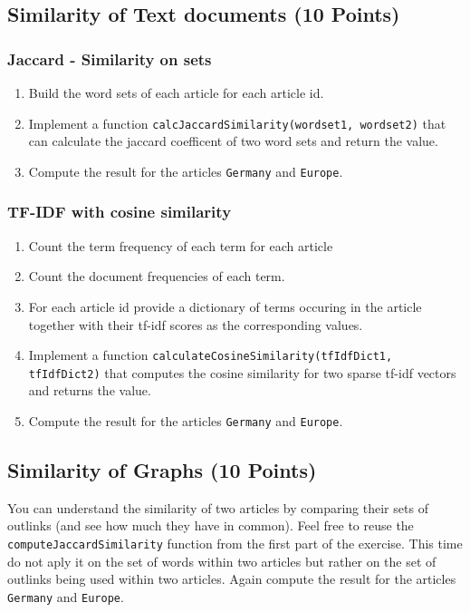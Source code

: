 \documentclass{WeSTassignment}
\begin{document}
\subsection{Similarity of Text documents  (10 Points)}
\subsubsection{Jaccard - Similarity on sets}
\begin{enumerate}
\item Build the word sets of each article for each article id.
\item Implement a function \texttt{calcJaccardSimilarity(wordset1, wordset2)} that can calculate the jaccard coefficent of two word sets and return the value.
\item Compute the result for the articles \texttt{Germany} and \texttt{Europe}.
\end{enumerate}

\subsubsection{TF-IDF with cosine similarity}
\begin{enumerate}
\item Count the term frequency of each term for each article
\item Count the document frequencies of each term. 
\item For each article id provide a dictionary of terms occuring in the article together with their tf-idf scores as the corresponding values.
\item Implement a function \texttt{calculateCosineSimilarity(tfIdfDict1, tfIdfDict2)} that computes the cosine similarity for two sparse tf-idf vectors and returns the value.
\item Compute the result for the articles \texttt{Germany} and \texttt{Europe}.
\end{enumerate}

\subsection{Similarity of Graphs (10 Points)}
You can understand the similarity of two articles by comparing their sets of outlinks (and see how much they have in common). Feel free to reuse the \texttt{computeJaccardSimilarity} function from the first part of the exercise. This time do not aply it on the set of words within two articles but rather on the set of outlinks being used within two articles. Again compute the result for the articles \texttt{Germany} and \texttt{Europe}.
\end{document}
